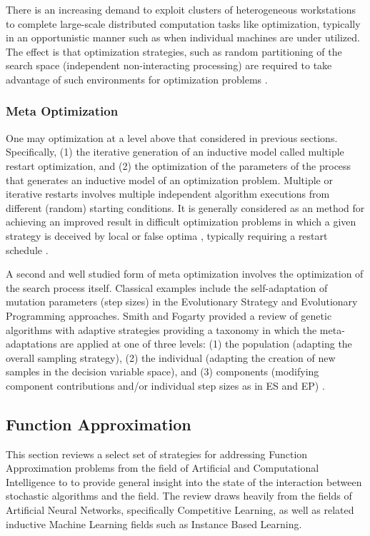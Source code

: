 \documentclass[a4paper, 11pt]{article}
\begin{document}
There is an increasing demand to exploit clusters of heterogeneous workstations to complete large-scale distributed computation tasks like optimization, typically in an opportunistic manner such as when individual machines are under utilized. The effect is that optimization strategies, such as random partitioning of the search space (independent non-interacting processing) are required to take advantage of such environments for optimization problems \cite{Schnekenburger1993, Liu2000}.
	
\subsubsection{Meta Optimization}
One may optimization at a level above that considered in previous sections. Specifically, (1) the iterative generation of an inductive model called multiple restart optimization, and (2) the optimization of the parameters of the process that generates an inductive model of an optimization problem. Multiple or iterative restarts involves multiple independent algorithm executions from different (random) starting conditions. It is generally considered as an method for achieving an improved result in difficult optimization problems in which a given strategy is deceived by local or false optima \cite{Muselli1997, Hu1994}, typically requiring a restart schedule \cite{Fukunaga1998}. 

A second and well studied form of meta optimization involves the optimization of the search process itself. Classical examples include the self-adaptation of mutation parameters (step sizes) in the Evolutionary Strategy and Evolutionary Programming approaches. Smith and Fogarty provided a review of genetic algorithms with adaptive strategies providing a taxonomy in which the meta-adaptations are applied at one of three levels: (1) the population (adapting the overall sampling strategy), (2) the individual (adapting the creation of new samples in the decision variable space), and (3) components (modifying component contributions and/or individual step sizes as in ES and EP) \cite{Smith1997b}.



%
%
\subsection{Function Approximation}
This section reviews a select set of strategies for addressing Function Approximation problems from the field of Artificial and Computational Intelligence to to provide general insight into the state of the interaction between stochastic algorithms and the field. The review draws heavily from the fields of Artificial Neural Networks, specifically Competitive Learning, as well as related inductive Machine Learning fields such as Instance Based Learning.
\end{document}
